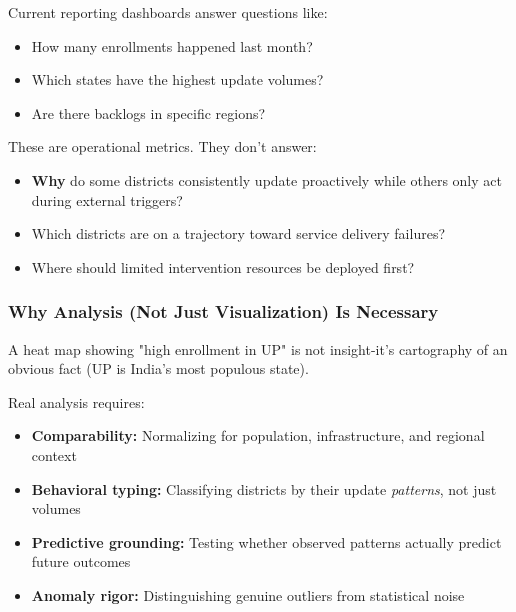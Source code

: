 \documentclass[11pt, a4paper]{article}
\begin{document}
Current reporting dashboards answer questions like:


\begin{itemize}
\item How many enrollments happened last month?

\item Which states have the highest update volumes?

\item Are there backlogs in specific regions?
\end{itemize}

These are operational metrics. They don't answer:


\begin{itemize}
\item \textbf{Why} do some districts consistently update proactively while others only act during external triggers?

\item Which districts are on a trajectory toward service delivery failures?

\item Where should limited intervention resources be deployed first?
\end{itemize}

\subsubsection{Why Analysis (Not Just Visualization) Is Necessary}

A heat map showing "high enrollment in UP" is not insight-it's cartography of an obvious fact (UP is India's most populous state).


Real analysis requires:


\begin{itemize}
\item \textbf{Comparability:} Normalizing for population, infrastructure, and regional context

\item \textbf{Behavioral typing:} Classifying districts by their update \textit{patterns}, not just volumes

\item \textbf{Predictive grounding:} Testing whether observed patterns actually predict future outcomes

\item \textbf{Anomaly rigor:} Distinguishing genuine outliers from statistical noise
\end{itemize}
\end{document}

